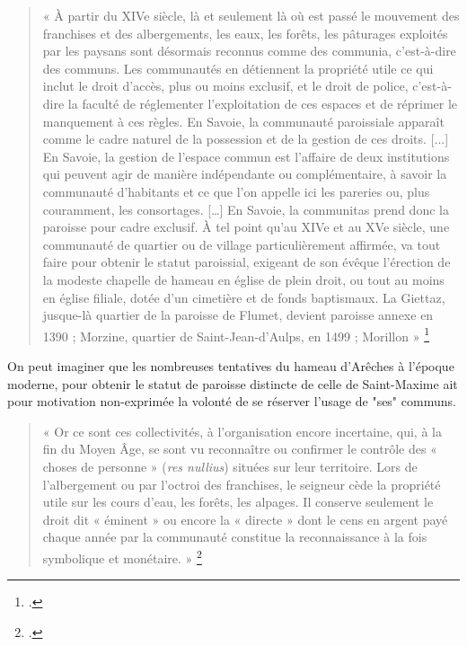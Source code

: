 \documentclass[12pt,a4paper]{report}
\begin{document}
\begin{quote}
	« À partir du XIVe siècle, là et seulement là où est passé le mouvement des franchises et des albergements, les eaux, les forêts, les pâturages exploités par les paysans sont désormais reconnus comme des communia, c’est-à-dire des communs. Les communautés en détiennent la propriété utile ce qui inclut le droit d’accès, plus ou moins exclusif, et le droit de police, c’est-à-dire la faculté de réglementer l’exploitation de ces espaces et de réprimer le manquement à ces règles. En Savoie, la communauté paroissiale apparaît comme le cadre naturel de la possession et de la gestion de ces droits. [...] En Savoie, la gestion de l’espace commun est l’affaire de deux institutions qui peuvent agir de manière indépendante ou complémentaire, à savoir la communauté d’habitants et ce que l’on appelle ici les pareries ou, plus couramment, les consortages. […]	En Savoie, la communitas prend donc la paroisse pour cadre exclusif. À tel point qu’au XIVe et au XVe siècle, une communauté de quartier ou de village particulièrement affirmée, va tout faire pour obtenir le statut paroissial, exigeant de son évêque l’érection de la modeste chapelle de hameau en église de plein droit, ou tout au moins en église filiale, dotée d’un cimetière et de fonds baptismaux. La Giettaz, jusque-là quartier de la paroisse de Flumet, devient paroisse annexe en 1390 ; Morzine, quartier de Saint-Jean-d’Aulps, en 1499 ; Morillon »
	\footcite[85]{Mouthon2016}
\end{quote}

On peut imaginer que les nombreuses tentatives du hameau d'Arêches à l'époque moderne, pour obtenir le statut de paroisse distincte de celle de Saint-Maxime ait pour motivation non-exprimée la volonté de se réserver l'usage de "ses" communs.

\begin{quote}
	« Or ce sont ces collectivités, à l’organisation encore incertaine, qui, à la fin du Moyen Âge, se sont vu reconnaître ou confirmer le contrôle des « choses de personne » (\textit{res nullius}) situées sur leur territoire. Lors de l’albergement ou par l’octroi des franchises, le seigneur cède la propriété utile sur les cours d’eau, les forêts, les alpages. Il conserve seulement le droit dit « éminent » ou encore la « directe » dont le cens en argent payé chaque année par la communauté constitue la reconnaissance à la fois symbolique et monétaire. »
	\footcite[86]{Mouthon2016}
\end{quote}
\end{document}

